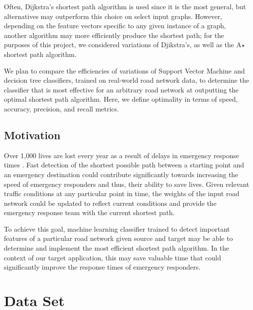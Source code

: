 \documentclass{article}
\begin{document}
Often, Dijkstra's shortest path algorithm is used since it is the most general, but alternatives may outperform this choice on select input graphs. However, depending on the feature vectors specific to any given instance of a graph, another algorithm may more efficiently produce the shortest path; for the purposes of this project, we considered variations of Djikstra's, as well as the A$\star$ shortest path algorithm.

We plan to compare the efficiencies of variations of Support Vector Machine and decision tree classifiers, trained on real-world road network data, to determine the classifier that is most effective for an arbitrary road network at outputting the optimal shortest path algorithm. Here, we define optimality in terms of speed, accuracy, precision, and recall metrics.

\subsection{Motivation}
Over 1,000 lives are lost every year as a result of delays in emergency response times . Fast detection of the shortest possible path between a starting point and an emergency destination could contribute significantly towards increasing the speed of emergency responders and thus, their ability to save lives. Given relevant traffic conditions at any particular point in time, the weights of the input road network could be updated to reflect current conditions and provide the emergency response team with the current shortest path.

To achieve this goal, machine learning classifier trained to detect important features of a particular road network given source and target may be able to determine and implement the most efficient shortest path algorithm. In the context of our target application, this may save valuable time that could significantly improve the response times of emergency responders.

\section{Data Set}
\end{document}
